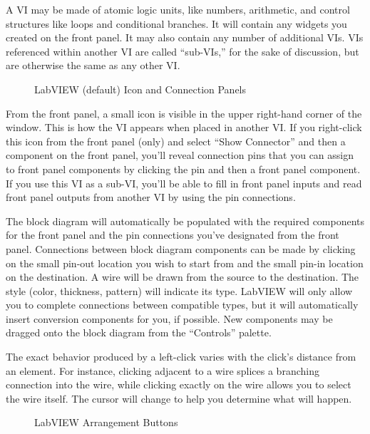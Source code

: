 A VI may be made of atomic logic units, like numbers, arithmetic, and control structures like loops and conditional branches.  It will contain any widgets you created on the front panel.  It may also contain any number of additional VIs.  VIs referenced within another VI are called ``sub-VIs,'' for the sake of discussion, but are otherwise the same as any other VI.

\begin{figure}[htbp]
  \centering
   \quad
  \caption{LabVIEW (default) Icon and Connection Panels}
  \label{fig:eq_labview:block_diagram:icon}
\end{figure}
From the front panel, a small icon is visible in the upper right-hand corner of the window.  This is how the VI appears when placed in another VI.  If you right-click this icon from the front panel (only) and select ``Show Connector'' and then a component on the front panel, you'll reveal connection pins that you can assign to front panel components by clicking the pin and then a front panel component.  If you use this VI as a sub-VI, you'll be able to fill in front panel inputs and read front panel outputs from another VI by using the pin connections.

The block diagram will automatically be populated with the required components for the front panel and the pin connections you've designated from the front panel.  Connections between block diagram components can be made by clicking on the small pin-out location you wish to start from and the small pin-in location on the destination.  A wire will be drawn from the source to the destination.  The style (color, thickness, pattern) will indicate its type.  LabVIEW will only allow you to complete connections between compatible types, but it will automatically insert conversion components for you, if possible.  New components may be dragged onto the block diagram from the ``Controls'' palette.

The exact behavior produced by a left-click varies with the click's distance from an element.  For instance, clicking adjacent to a wire splices a branching connection into the wire, while clicking exactly on the wire allows you to select the wire itself.  The cursor will change to help you determine what will happen.

\begin{figure}[htbp]
  \centering
  \caption{LabVIEW Arrangement Buttons}
  \label{fig:eq_labview:block_diagram:arrange}
\end{figure}

